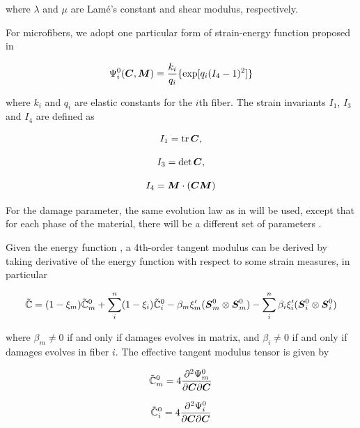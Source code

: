 \documentclass[12pt]{article}
\numberwithin{equation}{section}
\begin{document}
where $\lambda$ and $\mu$ are Lam\'{e}'s constant and shear modulus,
respectively.  

For microfibers, we adopt one particular form of strain-energy 
function proposed in \cite{Holzapfel.etal:2010}

\begin{equation}
  \Psi_i^0({\boldsymbol{C}}, {\boldsymbol{M}}) 
    = \frac{k_i}{q_i}
    \{ \exp[q_i(I_4 - 1)^2] \}
\end{equation}

where $k_i$ and $q_i$ are elastic constants for the $i$th fiber. 
The strain invariants $I_1$, $I_3$ and $I_4$ are defined as

\begin{equation}
  I_1 = \operatorname{\text{tr}} {\boldsymbol{C}}, 
\end{equation}

\begin{equation}
  I_3 = \det {\boldsymbol{C}},
\end{equation}

\begin{equation}
  I_4 = {\boldsymbol{M}} \cdot ({\boldsymbol{C}} {\boldsymbol{M}})
\end{equation}

For the damage parameter, the same evolution law as in 
 will be used, except that for each phase of the 
material, there will be a different set of parameters \cite{Chen.etal:2014}.

Given the energy function , a 4th-order
tangent modulus can be derived by taking derivative of the energy 
function with respect to some strain measures, in particular

\begin{equation}\label{eq:aniso_tangent}
  \tilde{\mathbb{C}} 
   = (1-\xi_m)\tilde{\mathbb{C}}_m^0 
   + \sum_i^n (1-\xi_i) \tilde{\mathbb{C}}_i^0
   -\beta_m \xi_m' ({\boldsymbol{S}}_m^0 \otimes {\boldsymbol{S}}_m^0 )
   - \sum_i^n \beta_i \xi_i' ({\boldsymbol{S}}_i^0 \otimes {\boldsymbol{S}}_i^0 )
\end{equation}

where $\beta_m\neq 0$ if and only if damages evolves in matrix, and
$\beta_i \neq 0$ if and only if damages evolves in fiber $i$. The 
effective tangent modulus tensor is given by

\begin{equation}\label{eq:aniso_tangent1}
  \tilde{\mathbb{C}}_m^0 = 
    4\frac{\partial ^2 \Psi_m^0}{\partial{\boldsymbol{C}} \partial{\boldsymbol{C}}}
\end{equation}

\begin{equation}\label{eq:aniso_tangent2}
  \tilde{\mathbb{C}}_i^0 =  
    4 \frac{\partial ^2 \Psi_i^0}{\partial{\boldsymbol{C}} \partial{\boldsymbol{C}}}
\end{equation}
\end{document}
